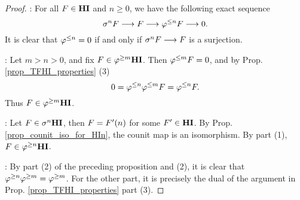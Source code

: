 \begin{proof}
 : For all $F \in \HI$ and $n \geq 0$, we have the 
following exact sequence
\[
\sgHI{n} F \to F \to \tlHI{n} F \to 0.
\]
It is clear that $\tlHI{n} = 0$ if and only if $\sgHI{n} F \to F$
is a surjection.

 : Let $m > n > 0$, and fix $F \in \THI{m}$. Then 
$\tlHI{m} F = 0$, and by Prop. \ref{prop_TFHI_properties} (3)
\[
0 = \tlHI{n}\tlHI{m} F = \tlHI{n} F.
\]
Thus $F \in \THI{m}$.

 : Let $F \in \sgHI{n} \HI$, then $F = \LHI[n]{F'}$ 
for some $F' \in \HI$. By Prop. \ref{prop_counit_iso_for_HIn},
the counit map is an isomorphism. By part (1), $F \in \THI{n}$.

 : By part (2) of the preceding proposition and (2), 
it is clear that $\tgHI{n} \tgHI{m} = \tgHI{m}$. For the other
part, it is precisely the dual of the argument in Prop. 
\ref{prop_TFHI_properties} part (3).

\end{proof}
